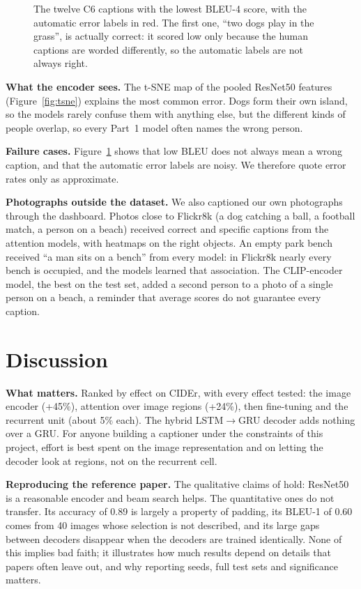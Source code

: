 \documentclass[11pt]{article}
\begin{document}
\begin{figure}[tbp]
\caption{The twelve C6 captions with the lowest BLEU-4 score, with the automatic error labels in red. The first one, ``two dogs play in the grass'', is actually correct: it scored low only because the human captions are worded differently, so the automatic labels are not always right.}
\label{fig:fail}
\end{figure}

\textbf{What the encoder sees.} The t-SNE map \cite{vandermaaten2008} of the pooled ResNet50 features (Figure~\ref{fig:tsne}) explains the most common error. Dogs form their own island, so the models rarely confuse them with anything else, but the different kinds of people overlap, so every Part~1 model often names the wrong person.

\textbf{Failure cases.} Figure~\ref{fig:fail} shows that low BLEU does not always mean a wrong caption, and that the automatic error labels are noisy. We therefore quote error rates only as approximate.

\textbf{Photographs outside the dataset.} We also captioned our own photographs through the dashboard. Photos close to Flickr8k (a dog catching a ball, a football match, a person on a beach) received correct and specific captions from the attention models, with heatmaps on the right objects. An empty park bench received ``a man sits on a bench'' from every model: in Flickr8k nearly every bench is occupied, and the models learned that association. The CLIP-encoder model, the best on the test set, added a second person to a photo of a single person on a beach, a reminder that average scores do not guarantee every caption.

\section{Discussion}\label{sec:discussion}

\textbf{What matters.} Ranked by effect on CIDEr, with every effect tested: the image encoder (+45\%), attention over image regions (+24\%), then fine-tuning and the recurrent unit (about 5\% each). The hybrid LSTM$\rightarrow$GRU decoder adds nothing over a GRU. For anyone building a captioner under the constraints of this project, effort is best spent on the image representation and on letting the decoder look at regions, not on the recurrent cell.

\textbf{Reproducing the reference paper.} The qualitative claims of \cite{kavitha2025} hold: ResNet50 is a reasonable encoder and beam search helps. The quantitative ones do not transfer. Its accuracy of 0.89 is largely a property of padding, its BLEU-1 of 0.60 comes from 40 images whose selection is not described, and its large gaps between decoders disappear when the decoders are trained identically. None of this implies bad faith; it illustrates how much results depend on details that papers often leave out, and why reporting seeds, full test sets and significance matters.
\end{document}
